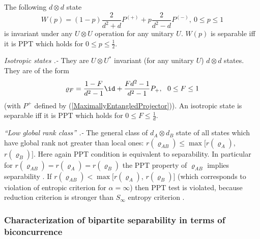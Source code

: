 \documentclass[rmp,12pt,preprint]{revtex4-2}
\begin{document}
The following $d \otimes d$ state
\begin{equation}
W(p)=(1-p)\frac{2}{d^{2}+d}P^{(+)}+p\frac{2}{d^{2}-d}P^{(-)}, \ 0\leq p
\leq 1 \label{Werner-state}
\end{equation}
is invariant under any $U \otimes U$ operation for any unitary $U$.
$W(p)$ is separable iff it is PPT which holds for $0 \leq p \leq
\frac{1}{2}$.

{\it Isotropic states \cite{reduction} .-} They are $U \otimes U^{*}$
invariant (for any unitary $U$) $d \otimes d$ states. They are of the
form
\begin{equation}
\varrho_{F}={1-F\over d^2-1} \id +{Fd^2-1\over d^2 -1} P_+,\ \
0\leq F \leq 1 \label{ntryplet}
\end{equation}
(with $P^{+}$ defined by (\ref{MaximallyEntangledProjector})).  An
isotropic state is separable iff it is PPT which holds for $0\leq F
\leq \frac{1}{d}$.

{\it ``Low global rank class'' \cite{Ho00} .-} The general class of
$d_{A} \otimes d_{B}$ state of all states which have global rank not
greater than local ones: $r(\varrho_{AB})\leq \max [r(\varrho_{A})$,
$r(\varrho_{B})]$.  Here again PPT condition is equivalent to
separability. In particular for
$r(\varrho_{AB})=r(\varrho_{A})=r(\varrho_{B})$ the PPT property of
$\varrho_{AB}$ implies separability \cite{Ho00}. If
$r(\varrho_{AB})<\max[r(\varrho_{A})$, $r(\varrho_{B})]$ (which
corresponds to violation of entropic criterion for $\alpha=\infty$)
then PPT test is violated, because reduction criterion is stronger
than $S_{\infty}$ entropy criterion \cite{HSTT}.



\subsubsection{Characterization of bipartite separability in terms of
biconcurrence}
\end{document}
